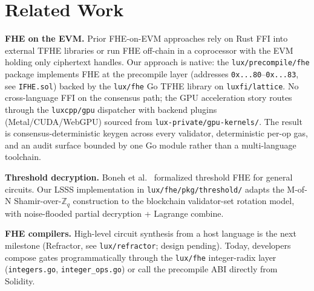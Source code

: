 \section{Related Work}

\label{sec:related}

\textbf{FHE on the EVM.} Prior FHE-on-EVM approaches rely on Rust FFI
into external TFHE libraries or run FHE off-chain in a coprocessor with
the EVM holding only ciphertext handles. Our approach is native: the
\texttt{lux/precompile/fhe} package implements FHE at the precompile
layer (addresses \texttt{0x...80}--\texttt{0x...83}, see
\texttt{IFHE.sol}) backed by the \texttt{lux/fhe} Go TFHE library on
\texttt{luxfi/lattice}. No cross-language FFI on the consensus path; the
GPU acceleration story routes through the \texttt{luxcpp/gpu}
dispatcher with backend plugins (Metal/CUDA/WebGPU) sourced from
\texttt{lux-private/gpu-kernels/}. The result is consensus-deterministic
keygen across every validator, deterministic per-op gas, and an audit
surface bounded by one Go module rather than a multi-language toolchain.

\textbf{Threshold decryption.} Boneh et al.~\cite{boneh2018threshold}
formalized threshold FHE for general circuits. Our LSSS implementation
in \texttt{lux/fhe/pkg/threshold/} adapts the M-of-N Shamir-over-$\mathbb{Z}_q$
construction to the blockchain validator-set rotation model, with
noise-flooded partial decryption + Lagrange combine.

\textbf{FHE compilers.} High-level circuit synthesis from a host
language is the next milestone (Refractor, see
\texttt{lux/refractor}; design pending). Today, developers compose
gates programmatically through the \texttt{lux/fhe} integer-radix layer
(\texttt{integers.go}, \texttt{integer\_ops.go}) or call the precompile
ABI directly from Solidity.

